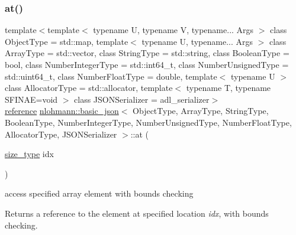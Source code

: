 \subsubsection{\texorpdfstring{at()}{at()}\hspace{0.1cm}{\footnotesize\ttfamily [1/6]}}
{\footnotesize\ttfamily template$<$template$<$ typename U, typename V, typename... Args $>$ class Object\+Type = std\+::map, template$<$ typename U, typename... Args $>$ class Array\+Type = std\+::vector, class String\+Type  = std\+::string, class Boolean\+Type  = bool, class Number\+Integer\+Type  = std\+::int64\+\_\+t, class Number\+Unsigned\+Type  = std\+::uint64\+\_\+t, class Number\+Float\+Type  = double, template$<$ typename U $>$ class Allocator\+Type = std\+::allocator, template$<$ typename T, typename S\+F\+I\+N\+A\+E=void $>$ class J\+S\+O\+N\+Serializer = adl\+\_\+serializer$>$ \\
\mbox{\hyperlink{classnlohmann_1_1basic__json_ac6a5eddd156c776ac75ff54cfe54a5bc}{reference}} \mbox{\hyperlink{classnlohmann_1_1basic__json}{nlohmann\+::basic\+\_\+json}}$<$ Object\+Type, Array\+Type, String\+Type, Boolean\+Type, Number\+Integer\+Type, Number\+Unsigned\+Type, Number\+Float\+Type, Allocator\+Type, J\+S\+O\+N\+Serializer $>$\+::at (\begin{DoxyParamCaption}\item[{\mbox{\hyperlink{classnlohmann_1_1basic__json_a39f2cd0b58106097e0e67bf185cc519b}{size\+\_\+type}}}]{idx }\end{DoxyParamCaption})\hspace{0.3cm}{\ttfamily [inline]}}



access specified array element with bounds checking 

Returns a reference to the element at specified location {\itshape idx}, with bounds checking.


